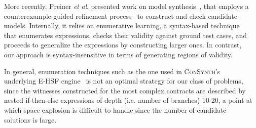 More recently, Preiner \textit{et al}. presented work on model synthesis~\cite{preiner2017counterexample}, %
that employs a counterexample-guided refinement process~\cite{reynolds2015counterexample}
to construct and check candidate models.
Internally, it relies on enumerative learning, a syntax-based technique that enumerates expressions, checks their validity against
ground test cases, and proceeds to generalize the expressions by constructing larger ones.
In contrast, our approach is syntax-insensitive in terms of generating regions of validity.
\iffalse
On top of that, CEGMS has only been tested against the theory of Boolean Vectors (BV, and BV$_{LNIRA}$), while \jsynvg supports the mixed theories of linear integer and real arithmetic.
\fi
In general, enumeration techniques such as the one used in \textsc{ConSynth}'s underlying E-HSF engine~\cite{beyene2014constraint} is not an optimal strategy for our class of problems, since the witnesses constructed for the most complex contracts are described by nested if-then-else expressions of depth (i.e. number of branches) 10-20, a point at which space explosion is difficult to handle since the number of candidate solutions is large.
